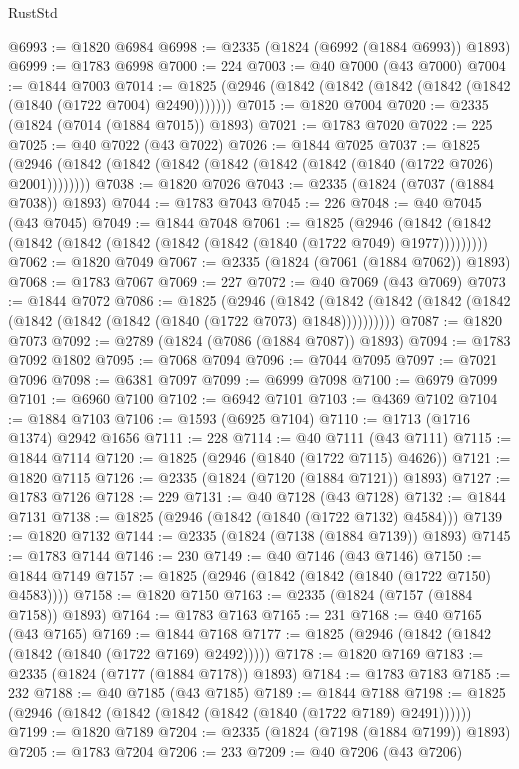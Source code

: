 \begin{lexlean}{RustStd}
\begin{coremodule}
@6993 := @1820 @6984
@6998 := @2335 (@1824 (@6992 (@1884 @6993)) @1893)
@6999 := @1783 @6998
@7000 := 224
@7003 := @40 @7000 (@43 @7000)
@7004 := @1844 @7003
@7014 := @1825 (@2946 (@1842 (@1842 (@1842 (@1842 (@1842 (@1840 (@1722 @7004) @2490)))))))
@7015 := @1820 @7004
@7020 := @2335 (@1824 (@7014 (@1884 @7015)) @1893)
@7021 := @1783 @7020
@7022 := 225
@7025 := @40 @7022 (@43 @7022)
@7026 := @1844 @7025
@7037 := @1825 (@2946 (@1842 (@1842 (@1842 (@1842 (@1842 (@1842 (@1840 (@1722 @7026) @2001))))))))
@7038 := @1820 @7026
@7043 := @2335 (@1824 (@7037 (@1884 @7038)) @1893)
@7044 := @1783 @7043
@7045 := 226
@7048 := @40 @7045 (@43 @7045)
@7049 := @1844 @7048
@7061 := @1825
    (@2946 (@1842 (@1842 (@1842 (@1842 (@1842 (@1842 (@1842 (@1840 (@1722 @7049) @1977)))))))))
@7062 := @1820 @7049
@7067 := @2335 (@1824 (@7061 (@1884 @7062)) @1893)
@7068 := @1783 @7067
@7069 := 227
@7072 := @40 @7069 (@43 @7069)
@7073 := @1844 @7072
@7086 := @1825
    (@2946
      (@1842 (@1842 (@1842 (@1842 (@1842 (@1842 (@1842 (@1842 (@1840 (@1722 @7073) @1848))))))))))
@7087 := @1820 @7073
@7092 := @2789 (@1824 (@7086 (@1884 @7087)) @1893)
@7094 := @1783 @7092 @1802
@7095 := @7068 @7094
@7096 := @7044 @7095
@7097 := @7021 @7096
@7098 := @6381 @7097
@7099 := @6999 @7098
@7100 := @6979 @7099
@7101 := @6960 @7100
@7102 := @6942 @7101
@7103 := @4369 @7102
@7104 := @1884 @7103
@7106 := @1593 (@6925 @7104)
@7110 := @1713 (@1716 @1374) @2942 @1656
@7111 := 228
@7114 := @40 @7111 (@43 @7111)
@7115 := @1844 @7114
@7120 := @1825 (@2946 (@1840 (@1722 @7115) @4626))
@7121 := @1820 @7115
@7126 := @2335 (@1824 (@7120 (@1884 @7121)) @1893)
@7127 := @1783 @7126
@7128 := 229
@7131 := @40 @7128 (@43 @7128)
@7132 := @1844 @7131
@7138 := @1825 (@2946 (@1842 (@1840 (@1722 @7132) @4584)))
@7139 := @1820 @7132
@7144 := @2335 (@1824 (@7138 (@1884 @7139)) @1893)
@7145 := @1783 @7144
@7146 := 230
@7149 := @40 @7146 (@43 @7146)
@7150 := @1844 @7149
@7157 := @1825 (@2946 (@1842 (@1842 (@1840 (@1722 @7150) @4583))))
@7158 := @1820 @7150
@7163 := @2335 (@1824 (@7157 (@1884 @7158)) @1893)
@7164 := @1783 @7163
@7165 := 231
@7168 := @40 @7165 (@43 @7165)
@7169 := @1844 @7168
@7177 := @1825 (@2946 (@1842 (@1842 (@1842 (@1840 (@1722 @7169) @2492)))))
@7178 := @1820 @7169
@7183 := @2335 (@1824 (@7177 (@1884 @7178)) @1893)
@7184 := @1783 @7183
@7185 := 232
@7188 := @40 @7185 (@43 @7185)
@7189 := @1844 @7188
@7198 := @1825 (@2946 (@1842 (@1842 (@1842 (@1842 (@1840 (@1722 @7189) @2491))))))
@7199 := @1820 @7189
@7204 := @2335 (@1824 (@7198 (@1884 @7199)) @1893)
@7205 := @1783 @7204
@7206 := 233
@7209 := @40 @7206 (@43 @7206)

\end{coremodule}
\end{lexlean}
